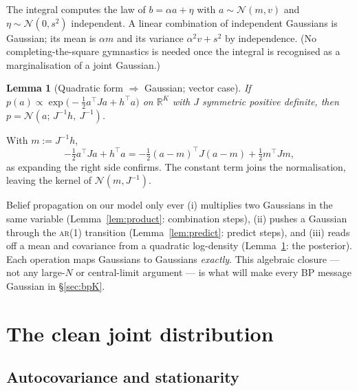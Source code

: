 \documentclass[11pt]{article}
\newtheorem{lemma}[proposition]{Lemma}
\theoremstyle{definition}
\newcommand{\R}{\mathbb{R}}
\newcommand{\N}{\mathcal{N}}
\newcommand{\T}{^{\!\top}}
\begin{document}
\begin{derivation}[\ref*{lem:predict}]
The integral computes the law of $b=\alpha a+\eta$ with $a\sim\N(m,v)$ and
$\eta\sim\N(0,s^2)$ independent. A linear combination of independent Gaussians
is Gaussian; its mean is $\alpha m$ and its variance
$\alpha^2v+s^2$ by independence. (No completing-the-square gymnastics is
needed once the integral is recognised as a marginalisation of a joint
Gaussian.)
\end{derivation}

\begin{lemma}[Quadratic form $\Rightarrow$ Gaussian; vector case]\label{lem:quad}
If $p(a)\propto\exp\!\big(-\tfrac12 a\T J a+h\T a\big)$ on $\R^K$ with $J$
symmetric positive definite, then $p=\N(a;\,J^{-1}h,\ J^{-1})$.
\end{lemma}

\begin{derivation}
With $m:=J^{-1}h$,
\[
  -\tfrac12a\T Ja+h\T a
  =-\tfrac12(a-m)\T J(a-m)+\tfrac12 m\T Jm ,
\]
as expanding the right side confirms. The constant term joins the
normalisation, leaving the kernel of $\N(m,J^{-1})$.
\end{derivation}

\begin{intuition}
Belief propagation on our model only ever (i) multiplies two Gaussians in the
same variable (Lemma~\ref{lem:product}: combination steps), (ii) pushes a
Gaussian through the \textsc{ar}(1) transition (Lemma~\ref{lem:predict}:
predict steps), and (iii) reads off a mean and covariance from a quadratic
log-density (Lemma~\ref{lem:quad}: the posterior). Each operation maps
Gaussians to Gaussians \emph{exactly}. This algebraic closure --- not any
large-$N$ or central-limit argument --- is what will make every BP message
Gaussian in \S\ref{sec:bpK}.
\end{intuition}

\section{The clean joint distribution}\label{sec:clean}

\subsection{Autocovariance and stationarity}
\end{document}
